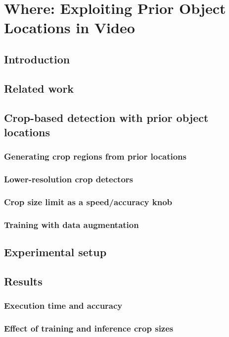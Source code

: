 \chapter{Where: Exploiting Prior Object Locations in Video}
\label{ch:where}


\section{Introduction}

\section{Related work}

\section{Crop-based detection with prior object locations}
\subsection{Generating crop regions from prior locations}
\subsection{Lower-resolution crop detectors}
\subsection{Crop size limit as a speed/accuracy knob}
\subsection{Training with data augmentation}

\section{Experimental setup}

\section{Results}
\subsection{Execution time and accuracy}
\subsection{Effect of training and inference crop sizes}
